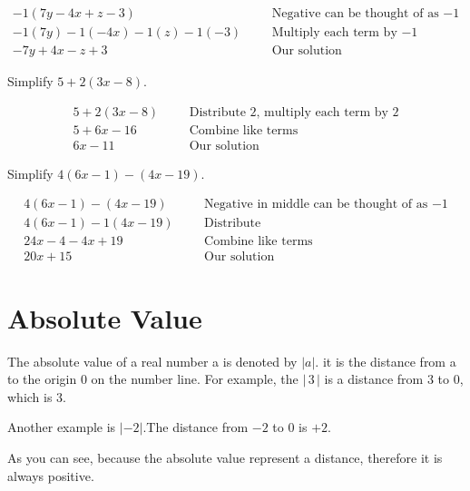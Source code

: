 \begin{align*}
	-1(7y-4x+z-3)& &&\text{Negative can be thought of as $-1$}\\
	-1(7y)-1(-4x)-1(z)-1(-3)& &&\text{Multiply each term by $-1$}\\
	-7y+4x-z+3&	&&\text{Our solution}
\end{align*}
\begin{exa}
	Simplify $5+2(3x-8)$.
\end{exa}
\begin{align*}
	5+2(3x-8)& &&\text{Distribute 2, multiply each term by 2}\\
	5+6x-16& &&\text{Combine like terms}\\
	6x-11&	&&\text{Our solution}
\end{align*}
\begin{exa}
	Simplify $4(6x-1)-(4x-19)$.
\end{exa}
\vspace{-0.4cm}
\begin{align*}
	4(6x-1)-(4x-19)& 
	&&\text{Negative in middle can be thought of as $− 1$}\\
	4(6x-1)-1(4x-19)& 
	&&\text{Distribute}\\
	24x-4-4x+19&	&&\text{Combine like terms}\\
	20x+15& &&\text{Our solution}
\end{align*}
\section{Absolute Value}
The absolute value of a real number a is denoted by $|a|$. it is the distance from a to the origin 0 on the number line. For example, the $\left|\,3\,\right|$ is a distance from 3 to 0, which is 3.
\begin{center}
\end{center}
%
Another example is $|-2|$.The distance from $-2$ to 0 is $+2$.
%
\begin{center}
\end{center}
%
As you can see, because the absolute value represent a distance, therefore it is always positive. 



